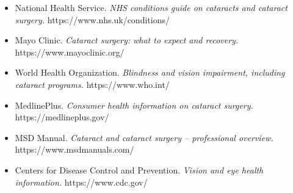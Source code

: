 \begin{itemize}
    \item National Health Service. \textit{NHS conditions guide on cataracts and cataract surgery.} https://www.nhs.uk/conditions/
    \item Mayo Clinic. \textit{Cataract surgery: what to expect and recovery.} https://www.mayoclinic.org/
    \item World Health Organization. \textit{Blindness and vision impairment, including cataract programs.} https://www.who.int/
    \item MedlinePlus. \textit{Consumer health information on cataract surgery.} https://medlineplus.gov/
    \item MSD Manual. \textit{Cataract and cataract surgery -- professional overview.} https://www.msdmanuals.com/
    \item Centers for Disease Control and Prevention. \textit{Vision and eye health information.} https://www.cdc.gov/
\end{itemize}

